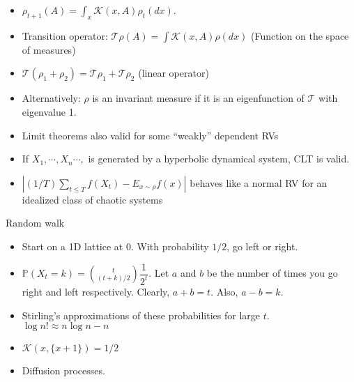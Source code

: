 \documentclass[final]{beamer}
\begin{document}
\begin{frame}
	\begin{itemize}
			\item $\rho_{t+1}(A) = \int_x \mathcal{K}(x, A) \rho_t(dx).$
			\item Transition operator: $\mathcal{T}\rho (A) = \int \mathcal{K}(x,A) \rho(dx)$ (Function on the space of measures) 

			\item $\mathcal{T}(\rho_1 + \rho_2) = \mathcal{T}\rho_1 + \mathcal{T}\rho_2 $ (linear operator) 
			\item Alternatively: $\rho$ is an invariant measure if it is an eigenfunction of $\mathcal{T}$ with eigenvalue 1. 

	\item Limit theorems also valid for some ``weakly'' dependent RVs
	\item If $X_1,\cdots, X_n\cdots,$ is generated by a hyperbolic dynamical system, CLT is valid.
	\item $|(1/T) \sum_{t\leq T} f(X_t) - E_{x \sim \rho} f(x)|$ behaves like a normal RV for an idealized class of chaotic systems 
\end{itemize}
\end{frame}

\begin{frame}{Random walk}
\begin{itemize}
	\item Start on a 1D lattice at 0. With probability $1/2$, go left or right. 
	\item $\mathbb{P}(X_t = k) = {t \choose (t+k)/2} \dfrac{1}{2^t}.$ Let $a$ and $b$ be the number of times you go right and left respectively. Clearly, $a + b = t.$ Also, $a-b = k.$
	\item Stirling's approximations of these probabilities for large $t.$  $\log n! \approx n \log n - n$
	\item $\mathcal{K}(x, \{x+1\}) = 1/2$
\item Diffusion processes.
\end{itemize}


\end{frame}
\end{document}
